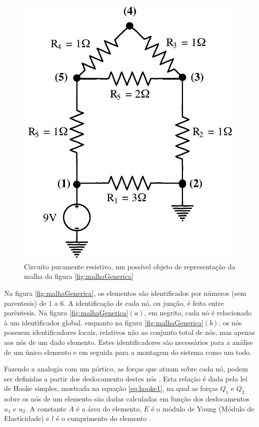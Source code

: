 \documentclass[
    12pt,               %
    openright,          %
    oneside,
    a4paper,            %
    english,            %
    french,             %
    spanish,            %
    brazil              %
    ]{abntex2}
\begin{document}
\begin{apendicesenv}
\begin{figure}[!htb]
	\centering
	\includegraphics[scale=0.6]{figuras/circuito.pdf}
	\caption{Circuito puramente resistivo, um possível objeto de representação da malha da figura \ref{fig:malhaGenerica}}
	\label{fig:repMalhaGenerica}
\end{figure}

Na figura \ref{fig:malhaGenerica}, os elementos são identificados por números (sem parentesis) de $1$ a $6$. A identificação de cada nó, ou junção, é feita entre parêntesis. Na figura \ref{fig:malhaGenerica}$(a)$, em negrito, cada nó é relacionado à um identificador global, enquanto na figura \ref{fig:malhaGenerica}$(b)$, os nós possuem identificadores locais, relativos não ao conjunto total de nós, mas apenas aos nós de um dado elemento. Estes identificadores são necessários para a análise de um único elemento e em seguida para a montagem do sistema como um todo.

Fazendo a analogia com um pórtico, as forças que atuam sobre cada nó, podem ser definidas a partir dos deslocamento destes nós \cite[p. 3]{zien}. Esta relação é dada pela lei de Hooke simples, mostrada na equação \ref{eq:hooke1}, na qual as forças $Q_1$ e $Q_2$ sobre os nós de um elemento são dadas calculadas em função dos deslocamentos $u_1$ e $u_2$. A constante $A$ é a área do elemento, $E$ é o módulo de Young (Módulo de Elasticidade) e $l$ é o cumprimento do elemento \cite[p. 13]{desai}.


\end{apendicesenv}
\end{document}
